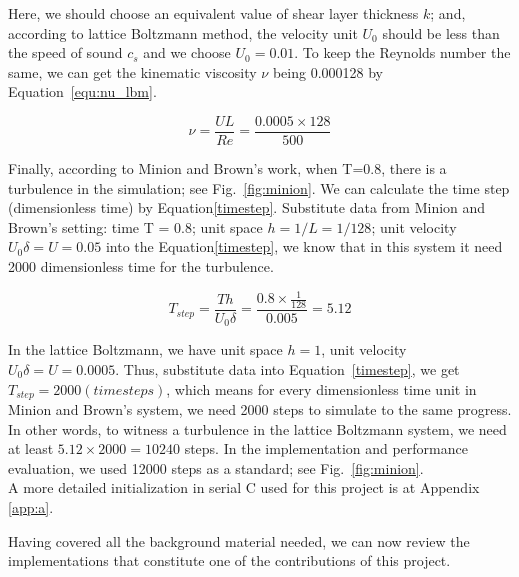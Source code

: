 Here, we should choose an equivalent value of shear layer thickness $k$; and, according to lattice Boltzmann method, the velocity unit $U_0$ should be less than the speed of sound $c_s$ and we choose $U_0 = 0.01$. To keep the Reynolds number the same, we can get the kinematic viscosity $\nu$ being 0.000128 by Equation~\ref{equ:nu_lbm}.

\begin{equation}
    \label{equ:nu_lbm}
    \nu = \frac{UL}{Re} = \frac{0.0005 \times 128}{500}  
\end{equation}

Finally, according to Minion and Brown's work, when T=0.8, there is a turbulence in the simulation; see Fig.~\ref{fig:minion}. We can calculate the time step (dimensionless time) by Equation\ref{timestep}. Substitute data from Minion and Brown's setting: time T = 0.8;  unit space $h=1/L=1/128$; unit velocity $U_0 \delta=U=0.05$  into the Equation\ref{timestep}, we know that in this system it need 2000 dimensionless time for the turbulence.

\begin{equation}
\label{timestep}
    T_{step} = \frac{T h}{U_0 \delta} = \frac{0.8 \times \frac{1}{128}}{0.005 } = 5.12
\end{equation}

In the lattice Boltzmann, we have unit space $h=1$, unit velocity $U_0 \delta = U = 0.0005$. Thus, substitute data into Equation~\ref{timestep}, we get $T_{step} = 2000 (timesteps)$, which means for every dimensionless time unit in Minion and Brown's system, we need 2000 steps to simulate to the same progress. In other words, to witness a turbulence in the lattice Boltzmann system, we need at least $5.12 \times 2000 = 10240$ steps. In the implementation and performance evaluation, we used 12000 steps as a standard; see Fig.~\ref{fig:minion}.\\

A more detailed initialization in serial C used for this project is at Appendix \ref{app:a}.


\vspace*{+3.2cm}
Having covered all the background material needed, we can now review the implementations that constitute one of the contributions of this project.

